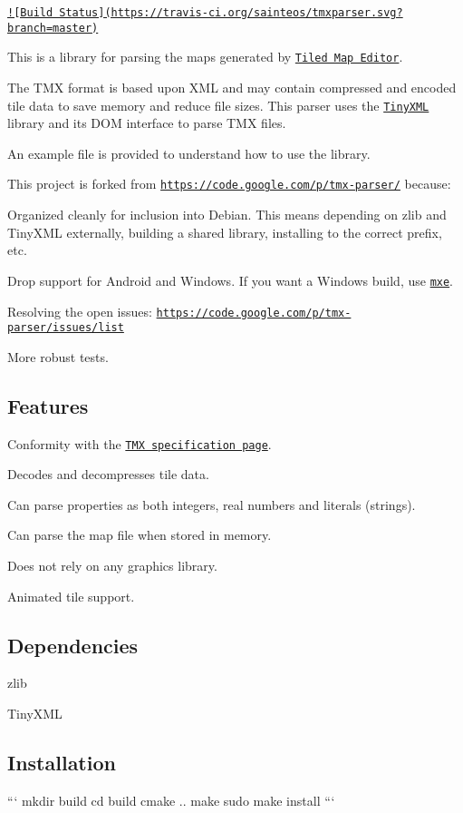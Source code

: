\href{https://travis-ci.org/sainteos/tmxparser}{\tt !\mbox{[}Build Status\mbox{]}(https\-://travis-\/ci.\-org/sainteos/tmxparser.\-svg?branch=master)}

This is a library for parsing the maps generated by \href{https://github.com/bjorn/tiled/}{\tt Tiled Map Editor}.

The T\-M\-X format is based upon X\-M\-L and may contain compressed and encoded tile data to save memory and reduce file sizes. This parser uses the \href{http://www.grinninglizard.com/tinyxml/}{\tt Tiny\-X\-M\-L} library and its D\-O\-M interface to parse T\-M\-X files.

An example file is provided to understand how to use the library.

This project is forked from \href{https://code.google.com/p/tmx-parser/}{\tt https\-://code.\-google.\-com/p/tmx-\/parser/} because\-:


\begin{DoxyItemize}
\item Organized cleanly for inclusion into Debian. This means depending on zlib and Tiny\-X\-M\-L externally, building a shared library, installing to the correct prefix, etc.
\item Drop support for Android and Windows. If you want a Windows build, use \href{https://github.com/mxe/mxe}{\tt mxe}.
\item Resolving the open issues\-: \href{https://code.google.com/p/tmx-parser/issues/list}{\tt https\-://code.\-google.\-com/p/tmx-\/parser/issues/list}
\item More robust tests.
\end{DoxyItemize}

\subsection*{Features}


\begin{DoxyItemize}
\item Conformity with the \href{http://doc.mapeditor.org/en/latest/reference/tmx-map-format/}{\tt T\-M\-X specification page}.
\item Decodes and decompresses tile data.
\item Can parse properties as both integers, real numbers and literals (strings).
\item Can parse the map file when stored in memory.
\item Does not rely on any graphics library.
\item Animated tile support.
\end{DoxyItemize}

\subsection*{Dependencies}


\begin{DoxyItemize}
\item zlib
\item Tiny\-X\-M\-L
\end{DoxyItemize}

\subsection*{Installation}

``` mkdir build cd build cmake .. make sudo make install ``` 